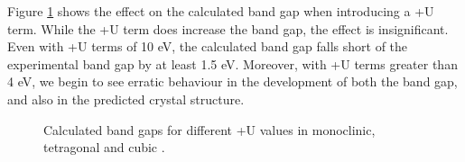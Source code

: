 Figure \ref{Figure:plusubandgap} shows the effect on the calculated band gap when introducing a +U term. While the +U term does increase the band gap, the effect is insignificant. Even with +U terms of 10 eV, the calculated band gap falls short of the experimental band gap by at least 1.5 eV. Moreover, with +U terms greater than 4 eV, we begin to see erratic behaviour in the development of both the band gap, and also in the predicted crystal structure.






\begin{figure}[h] %
\begin{center}
		\caption{Calculated band gaps for different +U values in monoclinic, tetragonal and cubic \zirconia .}
		\label{Figure:plusubandgap}
	\end{center}
\end{figure}


